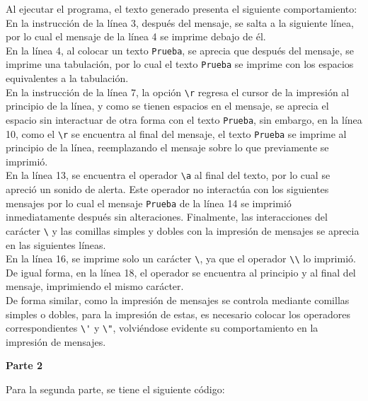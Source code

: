 \documentclass[a4paper,12pt]{report}
\begin{document}
Al ejecutar el programa, el texto generado presenta el siguiente comportamiento:
En la instrucción de la línea 3, después del mensaje, se salta a la siguiente línea, por lo cual el mensaje de la línea 4 se imprime debajo de él.\\
En la línea 4, al colocar un texto \verb+Prueba+, se aprecia que después del mensaje, se imprime una tabulación, por lo cual el texto \verb+Prueba+ se imprime con los espacios equivalentes a la tabulación.\\
En la instrucción de la línea 7, la opción \verb+\r+ regresa el cursor de la impresión al principio de la línea, y como se tienen espacios en el mensaje, se aprecia el espacio sin interactuar de otra forma con el texto \verb+Prueba+, sin embargo, en la línea 10, como el \verb+\r+ se encuentra al final del mensaje, el texto \verb+Prueba+ se imprime al principio de la línea, reemplazando el mensaje sobre lo que previamente se imprimió.\\
En la línea 13, se encuentra el operador \verb+\a+ al final del texto, por lo cual se apreció un sonido de alerta. Este operador no interactúa con los siguientes mensajes por lo cual el mensaje \verb+Prueba+ de la línea 14 se imprimió inmediatamente después sin alteraciones.
Finalmente, las interacciones del carácter \verb+\+ y las comillas simples y dobles con la impresión de mensajes se aprecia en las siguientes líneas.\\
En la línea 16, se imprime solo un carácter \verb+\+, ya que el operador \verb+\\+ lo imprimió. De igual forma, en la línea 18, el operador se encuentra al principio y al final del mensaje, imprimiendo el mismo carácter.\\
De forma similar, como la impresión de mensajes se controla mediante comillas simples o dobles, para la impresión de estas, es necesario colocar los operadores correspondientes \verb+\'+ y \verb+\"+, volviéndose evidente su comportamiento en la impresión de mensajes.
\vspace{0.5cm}


\vspace{1cm}

\textbf{Parte 2}\\

\vspace{1cm}

Para la segunda parte, se tiene el siguiente código:


\vspace{0.5cm}
\end{document}
